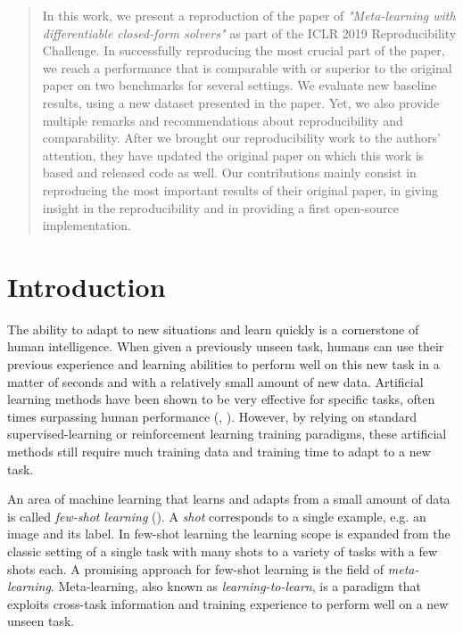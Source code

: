 \begin{abstract}
In this work, we present a reproduction of the paper of \citet{R2D2} \textit{"Meta-learning with differentiable closed-form solvers"} as part of the ICLR 2019 Reproducibility Challenge. In successfully reproducing the most crucial part of the paper, we reach a performance that is comparable with or superior to the original paper on two benchmarks for several settings. We evaluate new baseline results, using a new dataset presented in the paper. Yet, we also provide multiple remarks and recommendations about reproducibility and comparability. After we brought our reproducibility work to the authors' attention, they have updated the original paper on which this work is based and released code as well. Our contributions mainly consist in reproducing the most important results of their original paper, in giving insight in the reproducibility and in providing a first open-source implementation.
\end{abstract}

\section{Introduction}
The ability to adapt to new situations and learn quickly is a cornerstone of human intelligence. When given a previously unseen task, humans can use their previous experience and learning abilities to perform well on this new task in a matter of seconds and with a relatively small amount of new data. Artificial learning methods have been shown to be very effective for specific tasks, often times surpassing human performance (\citet{alphago}, \citet{dermato}). However, by relying on standard supervised-learning or reinforcement learning training paradigms, these artificial methods still require much training data and training time to adapt to a new task.

An area of machine learning that learns and adapts from a small amount of data is called \textit{few-shot learning} (\citet{fei2006one}). A \textit{shot} corresponds to a single example, e.g. an image and its label. In few-shot learning the learning scope is expanded from the classic setting of a single task with many shots to a variety of tasks with a few shots each. A promising approach for few-shot learning is the field of \textit{meta-learning}. Meta-learning, also known as \textit{learning-to-learn}, is a paradigm that exploits cross-task information and training experience to perform well on a new unseen task.

